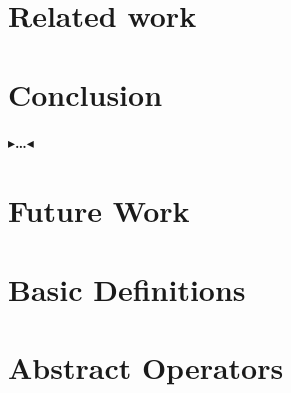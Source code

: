 \documentclass[twoside,11pt,openright]{report}
\theoremstyle{definition}
\newcommand{\todo}[1]{{\color[rgb]{.5,0,0}\textbf{$\blacktriangleright$#1$\blacktriangleleft$}}}
\begin{document}
\chapter{Related work}
\label{ch:relatedWork}


\chapter{Conclusion}
\label{ch:conclusion}

\todo{\dots}

\chapter{Future Work}
\label{ch:futureWork}





\newpage
\appendix
\chapter{Basic Definitions}
\label{app:lattice}


%

%

\chapter{Abstract Operators}
\label{app:abstract_operators}


\end{document}
